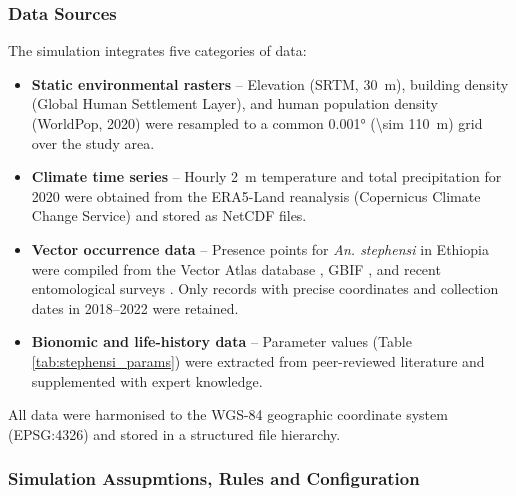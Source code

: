 \documentclass{article}
\begin{document}
\subsubsection{Data Sources}
\label{sec:data_sources}

The simulation integrates five categories of data:

\begin{itemize}
    \item \textbf{Static environmental rasters} -- Elevation (SRTM, \SI{30}{\meter}), building density (Global 
	Human Settlement Layer), and human population density (WorldPop, 2020) were resampled to a common \ang{0.001} 
	(\SI{\sim 110}{\meter}) grid over the study area.
    
    \item \textbf{Climate time series} -- Hourly \SI{2}{\meter} temperature and total precipitation for 2020 were 
	obtained from the ERA5-Land reanalysis (Copernicus Climate Change Service) and stored as NetCDF files.
    
    \item \textbf{Vector occurrence data} -- Presence points for \textit{An. stephensi} in Ethiopia were compiled from 
	the Vector Atlas database \citep{2025.VE.VAP}, GBIF \citep{2011.AN.BIG}, and recent entomological surveys 
	\citep{2020.MB.GDO, 2021.MB.AUO, 2023.DH.FRO}. Only records with precise coordinates and collection dates 
	in 2018--2022 were retained.
    
    \item \textbf{Bionomic and life-history data} -- Parameter values (Table \ref{tab:stephensi_params}) were extracted 
	from peer-reviewed literature \citep{2022.OC.TIT, 2023.JJ.BBA, 2025.CG.EOT} and supplemented with expert knowledge.
    
\end{itemize}

All data were harmonised to the WGS-84 geographic coordinate system (EPSG:4326) and stored in a structured file hierarchy.

\subsubsection{Simulation Assupmtions, Rules and Configuration}
\label{sec:sim_assumptions}
\end{document}

